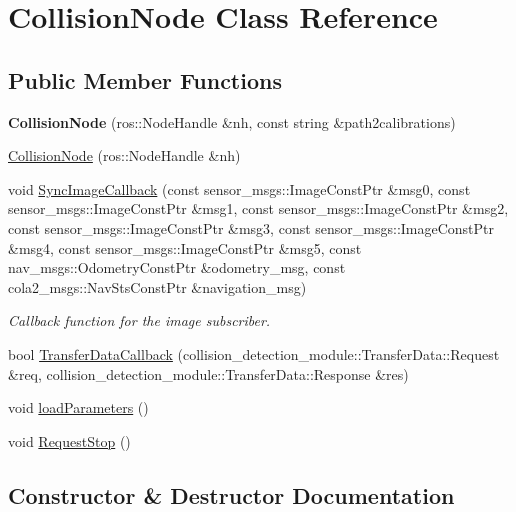 \hypertarget{classCollisionNode}{}\section{Collision\+Node Class Reference}
\label{classCollisionNode}
\subsection*{Public Member Functions}
\begin{DoxyCompactItemize}
\item 
\mbox{\label{classCollisionNode_a7b91dd4b1f27a56f00445e1a000dadd8}} 
{\bfseries Collision\+Node} (ros\+::\+Node\+Handle \&nh, const string \&path2calibrations)
\item 
\hyperlink{classCollisionNode_a21ec99403f4c69ed3228b5d94d3dc86b}{Collision\+Node} (ros\+::\+Node\+Handle \&nh)
\item 
void \hyperlink{classCollisionNode_a9e89d147a0f24c385ba33aeab2592ea8}{Sync\+Image\+Callback} (const sensor\+\_\+msgs\+::\+Image\+Const\+Ptr \&msg0, const sensor\+\_\+msgs\+::\+Image\+Const\+Ptr \&msg1, const sensor\+\_\+msgs\+::\+Image\+Const\+Ptr \&msg2, const sensor\+\_\+msgs\+::\+Image\+Const\+Ptr \&msg3, const sensor\+\_\+msgs\+::\+Image\+Const\+Ptr \&msg4, const sensor\+\_\+msgs\+::\+Image\+Const\+Ptr \&msg5, const nav\+\_\+msgs\+::\+Odometry\+Const\+Ptr \&odometry\+\_\+msg, const cola2\+\_\+msgs\+::\+Nav\+Sts\+Const\+Ptr \&navigation\+\_\+msg)
\begin{DoxyCompactList}\small\item\em Callback function for the image subscriber. \end{DoxyCompactList}\item 
bool \hyperlink{classCollisionNode_ad6e10b8e744b58de9ceea86c2a5a5661}{Transfer\+Data\+Callback} (collision\+\_\+detection\+\_\+module\+::\+Transfer\+Data\+::\+Request \&req, collision\+\_\+detection\+\_\+module\+::\+Transfer\+Data\+::\+Response \&res)
\item 
void \hyperlink{classCollisionNode_a284d796874c95ff2a412bb7ffe3822c1}{load\+Parameters} ()
\item 
void \hyperlink{classCollisionNode_aeaa098ea9a4c2b0793a42b29667457bd}{Request\+Stop} ()
\end{DoxyCompactItemize}


\subsection{Constructor \& Destructor Documentation}
\mbox{\label{classCollisionNode_a21ec99403f4c69ed3228b5d94d3dc86b}} 
